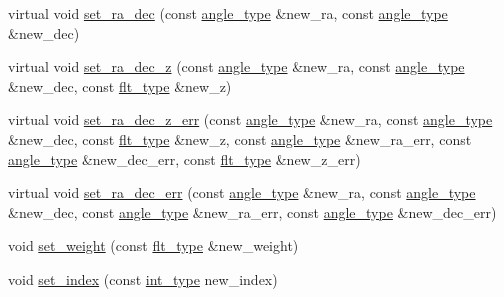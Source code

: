 \begin{DoxyCompactItemize}
\item 
virtual void \hyperlink{classIceBRG_1_1sky__obj_acc63bf57b29d17cfa02195457427d3b8}{set\+\_\+ra\+\_\+dec} (const \hyperlink{namespaceIceBRG_a688eeb0811a2474b20b667ed2e9625a1}{angle\+\_\+type} \&new\+\_\+ra, const \hyperlink{namespaceIceBRG_a688eeb0811a2474b20b667ed2e9625a1}{angle\+\_\+type} \&new\+\_\+dec)
\item 
virtual void \hyperlink{classIceBRG_1_1sky__obj_a51fcc5ab62077ffb3889f5993f54003b}{set\+\_\+ra\+\_\+dec\+\_\+z} (const \hyperlink{namespaceIceBRG_a688eeb0811a2474b20b667ed2e9625a1}{angle\+\_\+type} \&new\+\_\+ra, const \hyperlink{namespaceIceBRG_a688eeb0811a2474b20b667ed2e9625a1}{angle\+\_\+type} \&new\+\_\+dec, const \hyperlink{lib_2IceBRG__main_2common_8h_ad0f130a56eeb944d9ef2692ee881ecc4}{flt\+\_\+type} \&new\+\_\+z)
\item 
virtual void \hyperlink{classIceBRG_1_1sky__obj_a1c1e1575557bee033e839cd0d13da8d9}{set\+\_\+ra\+\_\+dec\+\_\+z\+\_\+err} (const \hyperlink{namespaceIceBRG_a688eeb0811a2474b20b667ed2e9625a1}{angle\+\_\+type} \&new\+\_\+ra, const \hyperlink{namespaceIceBRG_a688eeb0811a2474b20b667ed2e9625a1}{angle\+\_\+type} \&new\+\_\+dec, const \hyperlink{lib_2IceBRG__main_2common_8h_ad0f130a56eeb944d9ef2692ee881ecc4}{flt\+\_\+type} \&new\+\_\+z, const \hyperlink{namespaceIceBRG_a688eeb0811a2474b20b667ed2e9625a1}{angle\+\_\+type} \&new\+\_\+ra\+\_\+err, const \hyperlink{namespaceIceBRG_a688eeb0811a2474b20b667ed2e9625a1}{angle\+\_\+type} \&new\+\_\+dec\+\_\+err, const \hyperlink{lib_2IceBRG__main_2common_8h_ad0f130a56eeb944d9ef2692ee881ecc4}{flt\+\_\+type} \&new\+\_\+z\+\_\+err)
\item 
virtual void \hyperlink{classIceBRG_1_1sky__obj_ad6212c6ae1f7c611b3d3c7ce26a6f478}{set\+\_\+ra\+\_\+dec\+\_\+err} (const \hyperlink{namespaceIceBRG_a688eeb0811a2474b20b667ed2e9625a1}{angle\+\_\+type} \&new\+\_\+ra, const \hyperlink{namespaceIceBRG_a688eeb0811a2474b20b667ed2e9625a1}{angle\+\_\+type} \&new\+\_\+dec, const \hyperlink{namespaceIceBRG_a688eeb0811a2474b20b667ed2e9625a1}{angle\+\_\+type} \&new\+\_\+ra\+\_\+err, const \hyperlink{namespaceIceBRG_a688eeb0811a2474b20b667ed2e9625a1}{angle\+\_\+type} \&new\+\_\+dec\+\_\+err)
\item 
void \hyperlink{classIceBRG_1_1sky__obj_aa52e306222c5876c361edd1e565a7e64}{set\+\_\+weight} (const \hyperlink{lib_2IceBRG__main_2common_8h_ad0f130a56eeb944d9ef2692ee881ecc4}{flt\+\_\+type} \&new\+\_\+weight)
\item 
void \hyperlink{classIceBRG_1_1sky__obj_aef489cfe00b362dfdd58f5a1d8e7c3f7}{set\+\_\+index} (const \hyperlink{lib_2IceBRG__main_2common_8h_ac4de9d9335536ac22821171deec8d39e}{int\+\_\+type} new\+\_\+index)

\end{DoxyCompactItemize}
